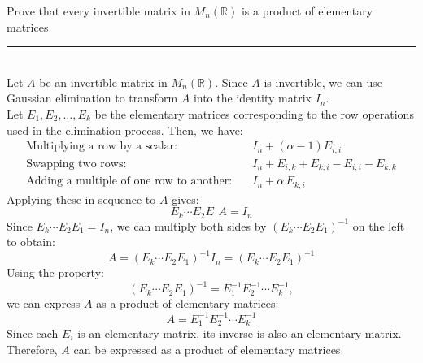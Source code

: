 \documentclass[a4paper, 9pt]{extarticle}
\begin{document}
\begin{examplebox}{}{}
  Prove that every invertible matrix in $M_n(\mathbb{R})$ is a product of elementary matrices.
  \\ \rule{\textwidth}{1px} \\
  Let $A$  be an invertible matrix in $M_n(\mathbb{R})$. Since $A$ is invertible, we can use Gaussian elimination to transform $A$ into the identity matrix $I_n$. \\[2ex]
  Let $E_1, E_2, \ldots, E_k$ be the elementary matrices corresponding to the row operations used in the elimination process. Then, we have:
  \begin{align*}
    \text{Multiplying a row by a scalar:}           & \quad I_n + (\alpha - 1)E_{i,i}                   \\
    \text{Swapping two rows:}                       & \quad I_n + E_{i,k} + E_{k,i} - E_{i,i} - E_{k,k} \\
    \text{Adding a multiple of one row to another:} & \quad I_n + \alpha\,E_{k,i}
  \end{align*}
  Applying these in sequence to $A$ gives:
  $$E_k \cdots E_2 E_1 A = I_n$$
  Since $E_k \cdots E_2 E_1 = I_n$, we can multiply both sides by $(E_k \cdots E_2 E_1)^{-1}$ on the left to obtain:
  $$A = (E_k \cdots E_2 E_1)^{-1} I_n = (E_k \cdots E_2 E_1)^{-1}$$
  Using the property:
  $$(E_k \cdots E_2 E_1)^{-1} = E_1^{-1} E_2^{-1} \cdots E_k^{-1},$$
  we can express $A$ as a product of elementary matrices:
  $$A = E_1^{-1} E_2^{-1} \cdots E_k^{-1}$$
  Since each $E_i$ is an elementary matrix, its inverse is also an elementary matrix. Therefore, $A$ can be expressed as a product of elementary matrices.
\end{examplebox}
\end{document}
